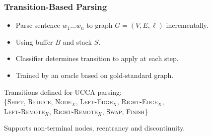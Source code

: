 \documentclass[t]{beamer}
\begin{document}
\begin{frame}
\frametitle{Transition-Based Parsing}
\begin{itemize}
 \item Parse sentence $w_1 \ldots w_n$ to graph $G=(V,E,\ell)$ incrementally.
 \item Using buffer $B$ and stack $S$.
 \item Classifier determines transition to apply at each step.
 \item Trained by an oracle based on gold-standard graph.
\end{itemize}

\begin{center}
\end{center}

\vfill
\pause
Transitions defined for UCCA parsing:\\
\{\textsc{Shift, Reduce, Node$_X$, Left-Edge$_X$, Right-Edge$_X$,}\\
\hspace{5mm}\textsc{Left-Remote$_X$, Right-Remote$_X$, Swap, Finish}\}

\vfill
\pause
Supports non-terminal nodes, reentrancy and discontinuity.
\end{frame}
\end{document}
